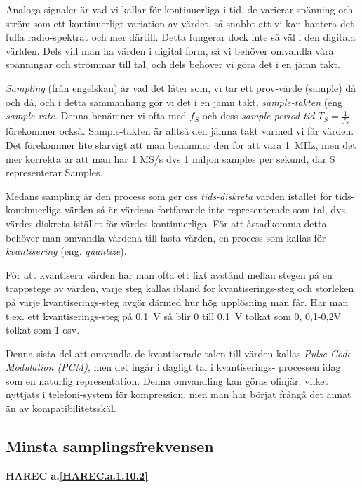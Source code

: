 \begin{rev-nytt}[MAD]

Analoga signaler är vad vi kallar för kontinuerliga i tid, de varierar spänning
och ström som ett kontinuerligt variation av värdet, så snabbt att vi kan
hantera det fulla radio-spektrat och mer därtill. Detta fungerar dock inte så
väl i den digitala världen. Dels vill man ha värden i digital form, så vi
behöver omvandla våra spänningar och strömmar till tal, och dels behöver vi
göra det i en jämn takt.

\emph{Sampling} (från engelskan) är vad det låter som, vi tar ett prov-värde
(sample) då och då, och i detta sammanhang gör vi det i en jämn takt,
\emph{sample-takten} (eng \emph{sample rate}. Denna benämner vi ofta med
\(f_S\) och dess \emph{sample period-tid} \(T_S=\frac{1}{f_S}\) förekommer
också. Sample-takten är alltså den jämna takt varmed vi får värden. Det
förekommer lite slarvigt att man benämner den för att vara 1~MHz, men det mer
korrekta är att man har 1 MS/s dvs 1 miljon samples per sekund, där S
representerar Samples.


Medans sampling är den process som ger oss \emph{tids-diskreta} värden istället
för tids-kontinuerliga värden så är värdena fortfarande inte representerade som
tal, dvs. värdes-diskreta istället för värdes-kontinuerliga. För att åstadkomma
detta behöver man omvandla värdena till fasta värden, en process som kallas för
\emph{kvantisering} (eng. \emph{quantize}).

För att kvantisera värden har man ofta ett fixt avstånd mellan stegen på en
trappstege av värden, varje steg kallas ibland för kvantiserings-steg och
storleken på varje kvantiserings-steg avgör därmed hur hög upplösning man får.
Har man t.ex. ett kvantiserings-steg på 0,1~V så blir 0 till 0,1~V tolkat som
0, 0,1-0,2V tolkat som 1 osv.


Denna sista del att omvandla de kvantiserade talen till värden kallas
\emph{Pulse Code Modulation (PCM)}, men det ingår i dagligt tal i kvantiserings-
processen idag som en naturlig representation. Denna omvandling kan göras
olinjär, vilket nyttjats i telefoni-system för kompression, men man har börjat
frångå det annat än av kompatibilitetsskäl.

\end{rev-nytt}

\subsection{Minsta samplingsfrekvensen}
\textbf{HAREC a.\ref{HAREC.a.1.10.2}\label{myHAREC.a.1.10.2}}

